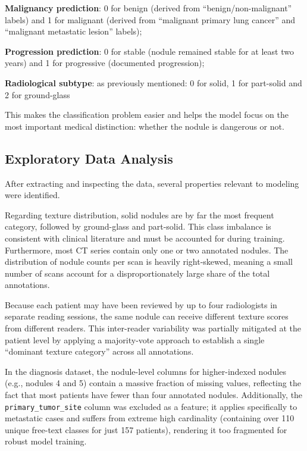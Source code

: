 \textbf{Malignancy prediction}: 0 for benign (derived from ``benign/non-malignant'' labels) and 1 for malignant (derived from ``malignant primary lung cancer'' and ``malignant metastatic lesion'' labels);

\textbf{Progression prediction}: 0 for stable (nodule remained stable for at least two years) and 1 for progressive (documented progression);

\textbf{Radiological subtype}: as previously mentioned: 0 for solid, 1 for part-solid and 2 for ground-glass

This makes the classification problem easier and helps the model focus on the most important medical distinction: whether the nodule is dangerous or not.

\subsection{Exploratory Data Analysis}

After extracting and inspecting the data, several properties relevant to modeling were identified.

Regarding texture distribution, solid nodules are by far the most frequent category, followed by ground-glass and part-solid. This class imbalance is consistent with clinical literature and must be accounted for during training. Furthermore, most CT series contain only one or two annotated nodules. The distribution of nodule counts per scan is heavily right-skewed, meaning a small number of scans account for a disproportionately large share of the total annotations.

Because each patient may have been reviewed by up to four radiologists in separate reading sessions, the same nodule can receive different texture scores from different readers. This inter-reader variability was partially mitigated at the patient level by applying a majority-vote approach to establish a single ``dominant texture category'' across all annotations.

In the diagnosis dataset, the nodule-level columns for higher-indexed nodules (e.g., nodules 4 and 5) contain a massive fraction of missing values, reflecting the fact that most patients have fewer than four annotated nodules. Additionally, the \texttt{primary\_tumor\_site} column was excluded as a feature; it applies specifically to metastatic cases and suffers from extreme high cardinality (containing over 110 unique free-text classes for just 157 patients), rendering it too fragmented for robust model training.

